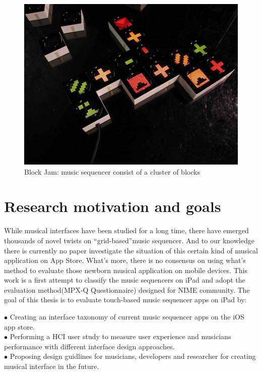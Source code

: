 \bigskip
\begin{figure}[h]
  \includegraphics[width=12 cm]{images/blockjam.jpg}
  \centering
  \caption{Block Jam: music sequencer consist of a cluster of blocks}
  \label{fig: Block Jam}
\end{figure}
\bigskip

\section{Research motivation and goals}

While musical interfaces have been studied for a long time, there have emerged thousands of novel twists on \textquotedblleft{grid-based}\textquotedblright music sequencer. And to our knowledge there is currently no paper investigate the situation of this certain kind of musical application on App Store. What's more, there is no consensus on using what's method to evaluate those newborn musical application on mobile devices. This work is a first attempt to classify the music sequencers on iPad and adopt the evaluation method(MPX-Q Questionnaire) designed for NIME community. The goal of this thesis is to evaluate touch-based music sequencer apps on iPad by:
\begin{flushleft}
$\bullet$ Creating an interface taxonomy of current music sequencer apps on the iOS app store.\\
$\bullet$ Performing a HCI user study to measure user experience and musicians performance with different interface design approaches.\\
$\bullet$ Proposing design guidlines for musicians, developers and researcher for creating musical interface in the future.
\end{flushleft}

